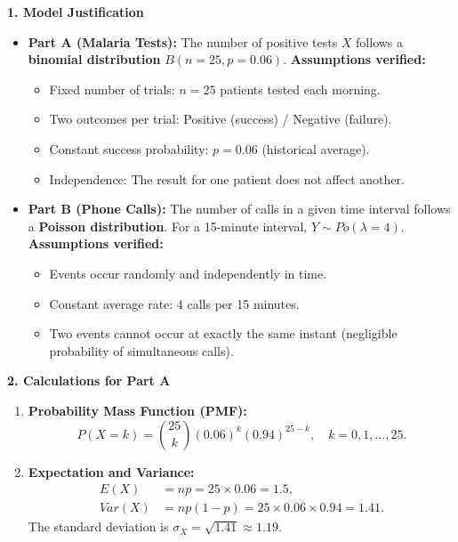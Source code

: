 \documentclass[11pt]{article}
\begin{document}
\begin{exoresolu}

\textbf{1. Model Justification}

\begin{itemize}
\item \textbf{Part A (Malaria Tests):} The number of positive tests $X$ follows a \textbf{binomial distribution} $B(n=25, p=0.06)$.  
      \textbf{Assumptions verified:}
      \begin{itemize}
      \item Fixed number of trials: $n = 25$ patients tested each morning.
      \item Two outcomes per trial: Positive (success) / Negative (failure).
      \item Constant success probability: $p = 0.06$ (historical average).
      \item Independence: The result for one patient does not affect another.
      \end{itemize}
\item \textbf{Part B (Phone Calls):} The number of calls in a given time interval follows a \textbf{Poisson distribution}. For a 15-minute interval, $Y \sim Po(\lambda = 4)$.  
      \textbf{Assumptions verified:}
      \begin{itemize}
      \item Events occur randomly and independently in time.
      \item Constant average rate: $4$ calls per 15 minutes.
      \item Two events cannot occur at exactly the same instant (negligible probability of simultaneous calls).
      \end{itemize}
\end{itemize}

\textbf{2. Calculations for Part A}

\begin{enumerate}
\item \textbf{Probability Mass Function (PMF):}
      \[
      P(X = k) = \binom{25}{k} (0.06)^k (0.94)^{25-k}, \quad k = 0,1,\dots,25.
      \]

\item \textbf{Expectation and Variance:}
      \begin{align*}
      E(X) &= np = 25 \times 0.06 = \mathbf{1.5}, \\
      Var(X) &= np(1-p) = 25 \times 0.06 \times 0.94 = \mathbf{1.41}.
      \end{align*}
      The standard deviation is $\sigma_X = \sqrt{1.41} \approx 1.19$.


\end{enumerate}
\end{exoresolu}
\end{document}
